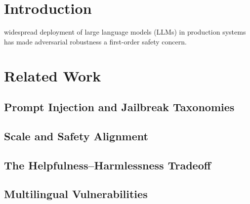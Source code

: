\documentclass[conference]{IEEEtran}
\begin{document}
\section{Introduction}
\label{sec:intro}


 widespread deployment of large language models
(LLMs) in production systems has made adversarial robustness a
first-order safety concern.

\section{Related Work}
\label{sec:related}


\subsection{Prompt Injection and Jailbreak Taxonomies}

\subsection{Scale and Safety Alignment}

\subsection{The Helpfulness--Harmlessness Tradeoff}

\subsection{Multilingual Vulnerabilities}
\end{document}
